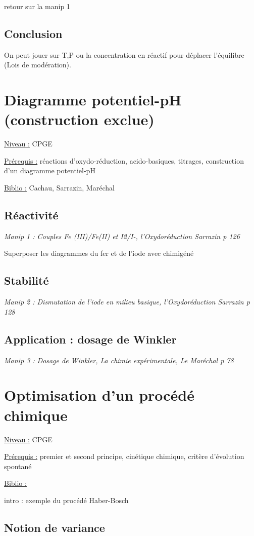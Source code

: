 \documentclass{article}%
\begin{document}
retour sur la manip 1

\subsection{Conclusion}

On peut jouer sur T,P ou la concentration en réactif pour déplacer l'équilibre (Lois de modération).

\section{Diagramme potentiel-pH (construction exclue)}
\underline{Niveau :} CPGE 

\underline{Prérequis :} réactions d'oxydo-réduction, acido-basiques, titrages, construction d'un diagramme potentiel-pH

\underline{Biblio :} Cachau, Sarrazin, Maréchal

\subsection{Réactivité}
\textit{Manip 1 : Couples Fe (III)/Fe(II) et I2/I-, l'Oxydoréduction Sarrazin p 126}

Superposer les diagrammes du fer et de l'iode avec chimigéné
\subsection{Stabilité}
\textit{Manip 2 : Dismutation de l'iode en milieu basique, l'Oxydoréduction Sarrazin p 128}
\subsection{Application : dosage de Winkler}
\textit{Manip 3 : Dosage de Winkler, La chimie expérimentale, Le Maréchal p 78}
\section{Optimisation d'un procédé chimique}
\underline{Niveau :} CPGE 

\underline{Prérequis :} premier et second principe, cinétique chimique, critère d'évolution spontané

\underline{Biblio :} 

intro : exemple du procédé Haber-Bosch

\subsection{Notion de variance}
\end{document}
